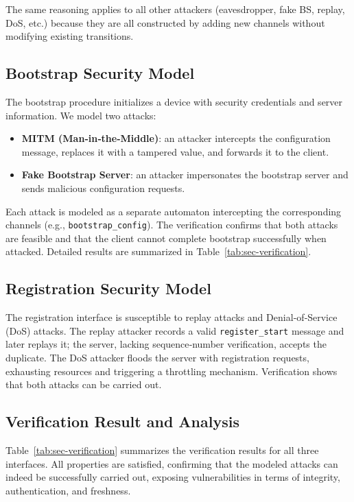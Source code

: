 \documentclass[a4paper,fleqn]{cas-sc}
\begin{document}
The same reasoning applies to all other attackers (eavesdropper, fake BS, replay, DoS, etc.) because they are all constructed by adding new channels without modifying existing transitions.


\subsection{Bootstrap Security Model}
The bootstrap procedure initializes a device with security credentials and server information. We model two attacks:
\begin{itemize}
    \item \textbf{MITM (Man‑in‑the‑Middle)}: an attacker intercepts the configuration message, replaces it with a tampered value, and forwards it to the client.
    \item \textbf{Fake Bootstrap Server}: an attacker impersonates the bootstrap server and sends malicious configuration requests.
\end{itemize}

Each attack is modeled as a separate automaton intercepting the corresponding channels (e.g., \texttt{bootstrap\_config}). The verification confirms that both attacks are feasible and that the client cannot complete bootstrap successfully when attacked. Detailed results are summarized in Table~\ref{tab:sec-verification}.

\subsection{Registration Security Model}
The registration interface is susceptible to replay attacks and Denial‑of‑Service (DoS) attacks. The replay attacker records a valid \texttt{register\_start} message and later replays it; the server, lacking sequence‑number verification, accepts the duplicate. The DoS attacker floods the server with registration requests, exhausting resources and triggering a throttling mechanism. Verification shows that both attacks can be carried out.


\subsection{Verification Result and Analysis}
Table~\ref{tab:sec-verification} summarizes the verification results for all three interfaces. All properties are satisfied, confirming that the modeled attacks can indeed be successfully carried out, exposing vulnerabilities in terms of integrity, authentication, and freshness.
\end{document}
